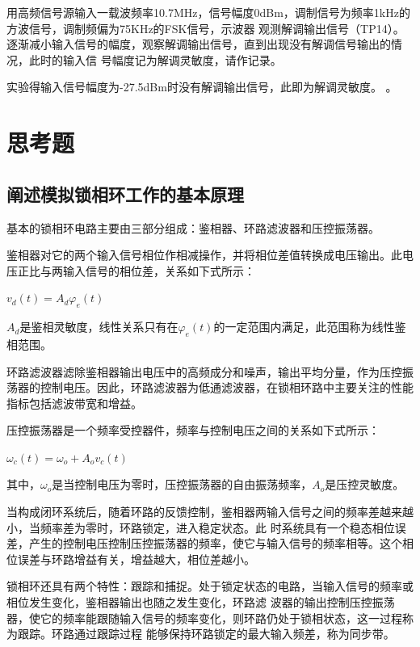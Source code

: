 \documentclass{../source/Experiment}
\begin{document}
            用高频信号源输入一载波频率10.7MHz，信号幅度0dBm，调制信号为频率1kHz的方波信号，调制频偏为75KHz的FSK信号，示波器
            观测解调输出信号（TP14）。逐渐减小输入信号的幅度，观察解调输出信号，直到出现没有解调信号输出的情况，此时的输入信
            号幅度记为解调灵敏度，请作记录。

            实验得输入信号幅度为-27.5dBm时没有解调输出信号，此即为解调灵敏度。
。
            
    \section{思考题}
	    \subsection{阐述模拟锁相环工作的基本原理 }
        
        基本的锁相环电路主要由三部分组成：鉴相器、环路滤波器和压控振荡器。

        鉴相器对它的两个输入信号相位作相减操作，并将相位差值转换成电压输出。此电压正比与两输入信号的相位差，关系如下式所示：

        $v_d(t) = A_d\varphi_e (t)$

        $A_d$是鉴相灵敏度，线性关系只有在$\varphi_e(t)$的一定范围内满足，此范围称为线性鉴相范围。

        环路滤波器滤除鉴相器输出电压中的高频成分和噪声，输出平均分量，作为压控振荡器的控制电压。因此，环路滤波器为低通滤波器，在锁相环路中主要关注的性能指标包括滤波带宽和增益。

        压控振荡器是一个频率受控器件，频率与控制电压之间的关系如下式所示：

        $\omega_c(t) = \omega_o + A_o v_c(t)$

        其中，$\omega_o$是当控制电压为零时，压控振荡器的自由振荡频率，$A_o$是压控灵敏度。

        当构成闭环系统后，随着环路的反馈控制，鉴相器两输入信号之间的频率差越来越小，当频率差为零时，环路锁定，进入稳定状态。此
        时系统具有一个稳态相位误差，产生的控制电压控制压控振荡器的频率，使它与输入信号的频率相等。这个相位误差与环路增益有关，增益越大，相位差越小。

        锁相环还具有两个特性：跟踪和捕捉。处于锁定状态的电路，当输入信号的频率或相位发生变化，鉴相器输出也随之发生变化，环路滤
        波器的输出控制压控振荡器，使它的频率能跟随输入信号的频率变化，则环路仍处于锁相状态，这一过程称为跟踪。环路通过跟踪过程
        能够保持环路锁定的最大输入频差，称为同步带。
\end{document}
